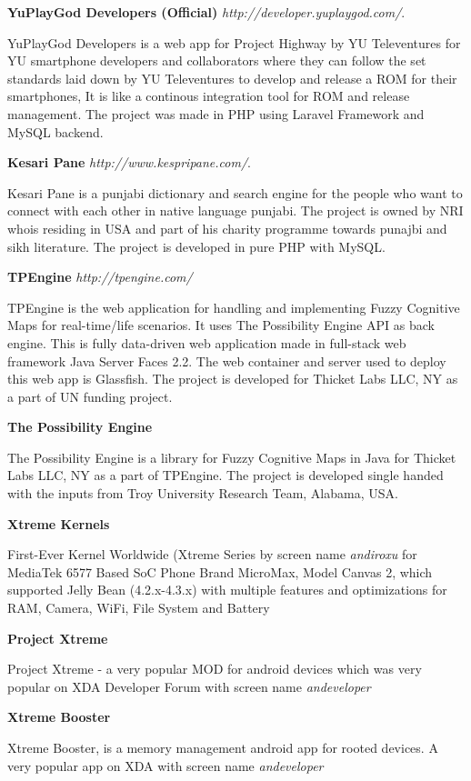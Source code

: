 \documentclass[margin,line]{res}
\begin{document}
\begin{resume}
\textbf{YuPlayGod Developers (Official)} {\em http://developer.yuplaygod.com/}.

YuPlayGod Developers is a web app for Project Highway by YU Televentures for YU smartphone developers and collaborators where they can follow the set standards laid down by YU Televentures to develop and release a ROM for their smartphones, It is like a continous integration tool for ROM and release management. The project was made in PHP using  Laravel Framework and MySQL backend.

\textbf{Kesari Pane} {\em http://www.kespripane.com/}.

Kesari Pane is a punjabi dictionary and search engine for the people who want to connect with each other in native language punjabi. The project is owned by NRI whois residing in USA and part of his charity programme towards punajbi and sikh literature. The project is developed in pure PHP with MySQL. 

\textbf{TPEngine} {\em http://tpengine.com/} 

TPEngine is the web application for handling and implementing Fuzzy Cognitive Maps for real-time/life scenarios. It uses The Possibility Engine API as back engine. This is fully data-driven web application made in full-stack web framework Java Server Faces 2.2. The web container and server used to deploy this web app is Glassfish. The project is developed for Thicket Labs LLC, NY as a part of UN funding project.

\textbf{The Possibility Engine} 

The Possibility Engine is a library for Fuzzy Cognitive Maps in Java for Thicket Labs LLC, NY as a part of TPEngine. The project is developed single handed with the inputs from Troy University Research Team, Alabama, USA.

\textbf{Xtreme Kernels} 

First-Ever Kernel Worldwide (Xtreme Series by screen name \textit{andiroxu} for MediaTek 6577 Based SoC Phone Brand MicroMax, Model Canvas 2, which supported Jelly Bean (4.2.x-4.3.x) with multiple features and optimizations for RAM, Camera, WiFi, File System and Battery 

\textbf{Project Xtreme} 

Project Xtreme - a very popular MOD for android devices which was very popular on XDA Developer Forum with screen name \textit{andeveloper}

\textbf{Xtreme Booster} 

Xtreme Booster, is a memory management android app for rooted devices. A very popular app on XDA with screen name \textit{andeveloper}



\end{resume}
\end{document}
